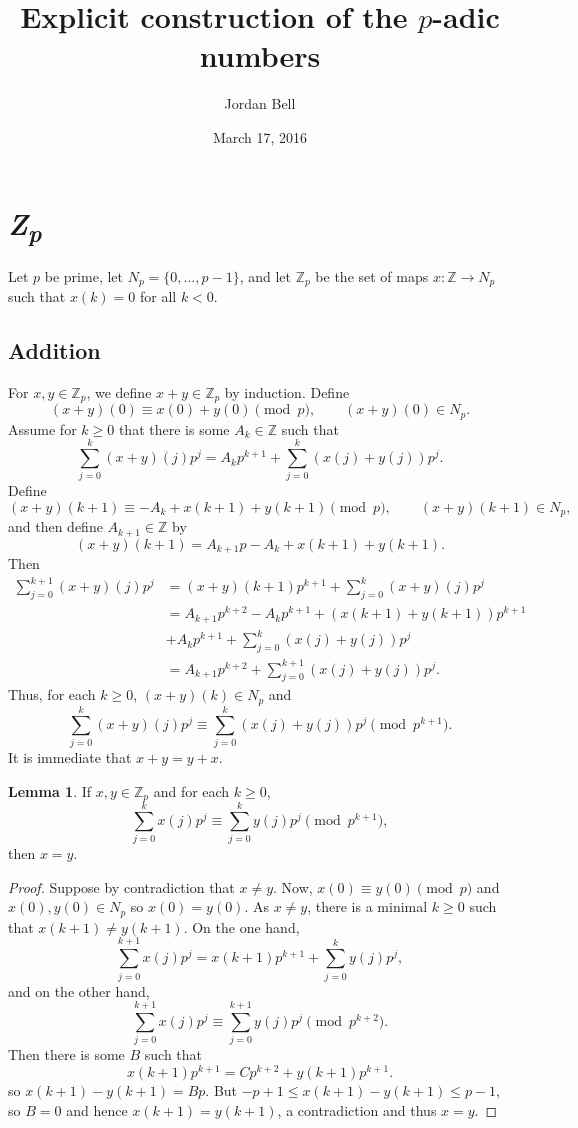\documentclass{article}
\theoremstyle{definition}
\newtheorem{lemma}[theorem]{Lemma}
\theoremstyle{definition}
\begin{document}
\title{Explicit construction of the $p$-adic numbers}
\author{Jordan Bell}
\date{March 17, 2016}

\maketitle

\section{{\em \textbf{Z}\textsubscript{p}}}
Let $p$ be prime, let $N_p = \{0,\ldots,p-1\}$, and
let $\mathbb{Z}_p$ be the set of maps $x:\mathbb{Z} \to N_p$ such that $x(k)=0$ for all $k<0$. 




\subsection{Addition}
For $x,y \in \mathbb{Z}_p$,
we define $x+y \in \mathbb{Z}_p$ by induction. Define
\[
(x+y)(0) \equiv x(0)+y(0) \pmod{p}, \qquad (x+y)(0) \in N_p.
\]
Assume  for  $k \geq 0$ that there is some 
$A_k \in \mathbb{Z}$ such that
\[
\sum_{j=0}^k (x+y)(j) p^j = A_k p^{k+1} +  \sum_{j=0}^k (x(j)+y(j))p^j.
\]
Define
\[
(x+y)(k+1) \equiv -A_k + x(k+1)+y(k+1) \pmod{p},\qquad (x+y)(k+1) \in N_p,
\]
and then define
$A_{k+1} \in \mathbb{Z}$ by
\[
(x+y)(k+1)= A_{k+1} p - A_k + x(k+1)+y(k+1).
\] 
Then
\begin{align*}
\sum_{j=0}^{k+1}(x+y)(j) p^j &=(x+y)(k+1) p^{k+1} + \sum_{j=0}^k (x+y)(j) p^j\\
&= A_{k+1} p^{k+2} - A_k p^{k+1} + (x(k+1)+y(k+1))p^{k+1}\\
&+A_k p^{k+1} +  \sum_{j=0}^k (x(j)+y(j))p^j\\
&=A_{k+1} p^{k+2} + \sum_{j=0}^{k+1}  (x(j)+y(j))p^j.
\end{align*}
Thus, for each $k \geq 0$, $(x+y)(k) \in N_p$ and 
\begin{equation}
\sum_{j=0}^k (x+y)(j) p^j \equiv \sum_{j=0}^k (x(j)+y(j)) p^j \pmod{p^{k+1}}.
\label{addition}
\end{equation}
It is immediate that $x+y=y+x$.

\begin{lemma}
If $x,y \in \mathbb{Z}_p$ and for each $k \geq 0$,  
\[
\sum_{j=0}^k x(j) p^j \equiv \sum_{j=0}^k y(j) p^j \pmod{p^{k+1}},
\]
then $x=y$.
\end{lemma}
\begin{proof}
Suppose by contradiction that $x \neq y$. Now, $x(0) \equiv y(0) \pmod{p}$
and $x(0),y(0) \in N_p$ so $x(0)=y(0)$. As $x \neq y$, there is  a minimal $k \geq 0$ such that  
$x(k+1) \neq y(k+1)$. On the one hand, 
\[
\sum_{j=0}^{k+1} x(j) p^j = x(k+1) p^{k+1} + \sum_{j=0}^k y(j) p^j,
\]
and on the other hand,
\[
\sum_{j=0}^{k+1} x(j) p^j  \equiv \sum_{j=0}^{k+1} y(j) p^j \pmod{p^{k+2}}.
\]
Then there is some $B$ such that 
\[
x(k+1)p^{k+1} =Cp^{k+2}+ y(k+1) p^{k+1}.
\]
so $x(k+1) - y(k+1) = Bp$. But $-p+1 \leq x(k+1)-y(k+1) \leq p-1$, so $B=0$ and hence
$x(k+1)=y(k+1)$, a contradiction and thus $x=y$.
\end{proof}
\end{document}
